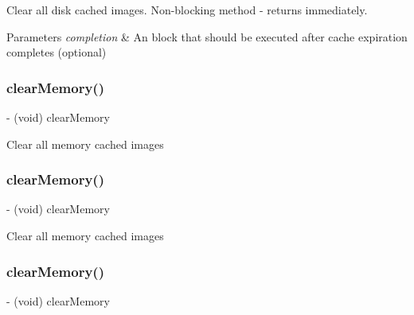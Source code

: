 Clear all disk cached images. Non-\/blocking method -\/ returns immediately. 
\begin{DoxyParams}{Parameters}
{\em completion} & An block that should be executed after cache expiration completes (optional) \\
\hline
\end{DoxyParams}
\mbox{\label{interface_s_d_image_cache_a931b161c379dd952affffe8c0544527d}} 
\subsubsection{\texorpdfstring{clear\+Memory()}{clearMemory()}\hspace{0.1cm}{\footnotesize\ttfamily [1/3]}}
{\footnotesize\ttfamily -\/ (void) clear\+Memory \begin{DoxyParamCaption}{ }\end{DoxyParamCaption}}

Clear all memory cached images \mbox{\label{interface_s_d_image_cache_a931b161c379dd952affffe8c0544527d}} 
\subsubsection{\texorpdfstring{clear\+Memory()}{clearMemory()}\hspace{0.1cm}{\footnotesize\ttfamily [2/3]}}
{\footnotesize\ttfamily -\/ (void) clear\+Memory \begin{DoxyParamCaption}{ }\end{DoxyParamCaption}}

Clear all memory cached images \mbox{\label{interface_s_d_image_cache_a931b161c379dd952affffe8c0544527d}} 
\subsubsection{\texorpdfstring{clear\+Memory()}{clearMemory()}\hspace{0.1cm}{\footnotesize\ttfamily [3/3]}}
{\footnotesize\ttfamily -\/ (void) clear\+Memory \begin{DoxyParamCaption}{ }\end{DoxyParamCaption}}

